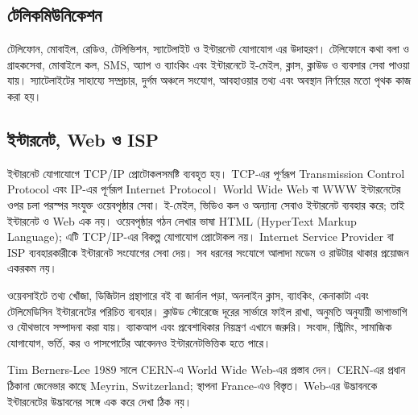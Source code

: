 \begin{topicbody}
\subsection{টেলিকমিউনিকেশন}
টেলিফোন, মোবাইল, রেডিও, টেলিভিশন, স্যাটেলাইট ও ইন্টারনেট যোগাযোগ এর উদাহরণ। টেলিফোনে কথা বলা ও গ্রাহকসেবা, মোবাইলে কল, SMS, অ্যাপ ও ব্যাংকিং এবং ইন্টারনেটে ই-মেইল, ক্লাস, ক্লাউড ও ব্যবসার সেবা পাওয়া যায়। স্যাটেলাইটের সাহায্যে সম্প্রচার, দুর্গম অঞ্চলে সংযোগ, আবহাওয়ার তথ্য এবং অবস্থান নির্ণয়ের মতো পৃথক কাজ করা হয়।

\subsection{ইন্টারনেট, Web ও ISP}
\label{sec:ch1-internet-web}
ইন্টারনেট যোগাযোগে TCP/IP প্রোটোকলসমষ্টি ব্যবহৃত হয়। TCP-এর পূর্ণরূপ Transmission Control Protocol এবং IP-এর পূর্ণরূপ Internet Protocol। World Wide Web বা WWW ইন্টারনেটের ওপর চলা পরস্পর সংযুক্ত ওয়েবপৃষ্ঠার সেবা। ই-মেইল, ভিডিও কল ও অন্যান্য সেবাও ইন্টারনেট ব্যবহার করে; তাই ইন্টারনেট ও Web এক নয়। ওয়েবপৃষ্ঠার গঠন লেখার ভাষা HTML (HyperText Markup Language); এটি TCP/IP-এর বিকল্প যোগাযোগ প্রোটোকল নয়। Internet Service Provider বা ISP ব্যবহারকারীকে ইন্টারনেট সংযোগের সেবা দেয়। সব ধরনের সংযোগে আলাদা মডেম ও রাউটার থাকার প্রয়োজন একরকম নয়।

ওয়েবসাইটে তথ্য খোঁজা, ডিজিটাল গ্রন্থাগারে বই বা জার্নাল পড়া, অনলাইন ক্লাস, ব্যাংকিং, কেনাকাটা এবং টেলিমেডিসিন ইন্টারনেটের পরিচিত ব্যবহার। ক্লাউড স্টোরেজে দূরের সার্ভারে ফাইল রাখা, অনুমতি অনুযায়ী ভাগাভাগি ও যৌথভাবে সম্পাদনা করা যায়। ব্যাকআপ এবং প্রবেশাধিকার নিয়ন্ত্রণ এখানে জরুরি। সংবাদ, স্ট্রিমিং, সামাজিক যোগাযোগ, ভর্তি, কর ও পাসপোর্টের আবেদনও ইন্টারনেটভিত্তিক হতে পারে।

Tim Berners-Lee 1989 সালে CERN-এ World Wide Web-এর প্রস্তাব দেন। CERN-এর প্রধান ঠিকানা জেনেভার কাছে Meyrin, Switzerland; স্থাপনা France-এও বিস্তৃত। Web-এর উদ্ভাবনকে ইন্টারনেটের উদ্ভাবনের সঙ্গে এক করে দেখা ঠিক নয়।


\end{topicbody}
